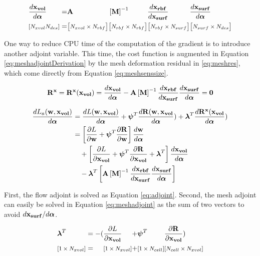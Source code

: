 \documentclass[letterpaper,12pt,]{article}
\begin{document}
\begin{equation}
\begin{alignedat}{6}
	&\Dt{\xvol}{\balfa}
	&&=
	&& \mbf{A}
	&& \inv{\mbf{M}}      
	&& \Dt{\xrbf}{\xsurf} 
	&& \Dt{\xsurf}{\balfa}
\\	                   
	&\smt{\left[\nxvol \ndes \right]}
	&&=
	&&\nxn{\nxvol}{\nrbf}
	&&\nxn{\nrbf}{\nrbf}
	&&\nxn{\nrbf}{N_{surf}}
	&&\nxn{N_{surf}}{\ndes}
\label{eq:meshsenssize}
\end{alignedat}
\end{equation}

One way to reduce CPU time of the computation of the gradient is to introduce another adjoint variable.
This time, the cost function is augmented in Equation \ref{eq:meshadjointDerivation} by the mesh deformation residual in \ref{eq:meshres}, which come directly from Equation \ref{eq:meshsenssize}.

\begin{equation}
	\bR^{\mbf{x}} 
	= \bR^{\mbf{x}}(\xvol) 
	= \Dt{\xvol}{\balfa} 
	- \mbf{A}
	\inv{\mbf{M}}
	\Dt{\xrbf}{\xsurf}
	\Dt{\xsurf}{\balfa}
	= \mbf{0}
	\label{eq:meshres}
\end{equation}

\begin{equation}
\begin{split}
	\Dt{L_a( \bw, \xvol )}{\balfa} &= 
	\Dt{L( \bw, \xvol )}{\balfa} 
	+
	\bpsi^T
	\Dt{\bR( \bw, \xvol }{\balfa})
	+
	\blam^T
	\Dt{\bR^{\mbf{x}}(\xvol }{\balfa})
\\
	&=
	\sqbr{
		\del{L}{\bw}
		+
		\bpsi^T
		\del{\bR}{\bw}
	}
	\Dt{\bw}{\balfa}
	\\
	&\quad+
	\sqbr{
		\del{L}{\xvol}
		+
		\bpsi^T
		\del{\bR}{\xvol}
		+
		\blam^T
	}
	\Dt{\xvol}{\balfa}
	\\
	&\quad-
	\blam^T
	\sqbr{
		\mbf{A}
		\inv{\mbf{M}}
		\Dt{\xrbf}{\xsurf}
		\Dt{\xsurf}{\balfa}
	}
	\label{eq:meshadjointDerivation}
\end{split}
\end{equation}

First, the flow adjoint is solved as Equation \ref{eq:adjoint}.
Second, the mesh adjoint can easily be solved in Equation \ref{eq:meshadjoint} as the sum of two vectors to avoid $d\mathbf{x_{surf}}/d\boldsymbol{\alpha}$.

\begin{equation}
\begin{alignedat}{6}
	&\blam^T 
	&&= 
	-(&&\del{L}{\xvol}
	&&+
	&&\bpsi^T
	&&\del{\bR}{\xvol})
\\	                   
	&\smt{\left[1 \times \nxvol \right]}
	&&=
	&&\nxn{1}{\nxvol}
	&&+
	&&\nxn{1}{\ncell}
	&&\nxn{\ncell}{\nxvol}
\label{eq:meshadjoint}
\end{alignedat}
\end{equation}
\end{document}
